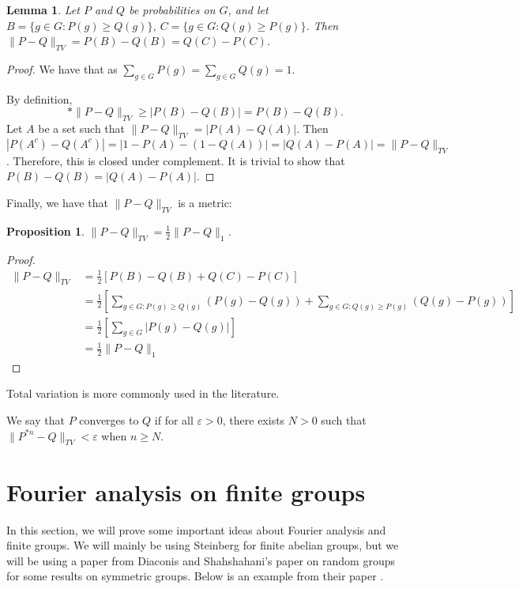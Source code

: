 \documentclass[]{article}
\newtheorem{proposition}[theorem]{Proposition}
\newtheorem{lemma}[theorem]{Lemma}
\theoremstyle{definition}
\numberwithin{theorem}{section}
\numberwithin{equation}{section}
\begin{document}
\begin{lemma}
	Let $P$ and $Q$ be probabilities on $G$, and let $B = \lbrace g \in G : P(g) \geq Q(g) \rbrace$, $C = \lbrace g \in G : Q(g) \geq P(g) \rbrace$.
	Then $\|P - Q \|_{TV} = P(B) - Q(B) = Q(C) - P(C)$.
\end{lemma}
\begin{proof}
	We have that as $\sum_{g \in G} P(g) = \sum_{g \in G} Q(g) = 1$. 
	
	
	By definition, 
	\begin{equation}*
		\|P - Q\|_{TV} \geq |P(B) - Q(B)| = P(B) - Q(B).
	\end{equation}
	Let $A$ be a set such that $\|P - Q\|_{TV} = |P(A) - Q(A)|.$ Then $|P(A^c) - Q(A^c)| = |1 - P(A) - (1 - Q(A))| = |Q(A) - P(A)| = \|P - Q \|_{TV}$. Therefore, this is closed under complement. It is trivial to show that $P(B) - Q(B) = |Q(A) - P(A)|$. 
\end{proof}
Finally, we have that $\|P - Q \|_{TV}$ is a metric:
\begin{proposition}
	\label{prop:distribution difference equality}
	$\|P - Q\|_{TV} = \frac{1}{2} \|P - Q \|_1$. 
\end{proposition}
\begin{proof}
	\begin{align*}
		\|P - Q\|_{TV} &= \frac{1}{2}[P(B) - Q(B) + Q(C) - P(C)]\\
		&=\frac{1}{2}\left[ \sum_{g \in G : P(g) \geq Q(g)} (P(g) - Q(g)) + \sum_{g \in G : Q(g) \geq P(g)} (Q(g) - P(g)) \right]\\
		&= \frac{1}{2}\left[ \sum_{g \in G}|P(g) - Q(g)| \right]\\
		&= \frac{1}{2}\|P - Q\|_1
	\end{align*}
\end{proof}
Total variation is more commonly used in the literature.

We say that $P$ converges to $Q$ if for all $\varepsilon > 0$, there exists $N > 0$ such that $\|P^{*n}- Q \|_{TV} < \varepsilon$ when $n \geq N$. 

\section{Fourier analysis on finite groups}\label{sec:Fourier Analysis}
In this section, we will prove some important ideas about Fourier analysis and finite groups. We will mainly be using Steinberg \cite{steinbergProbabilityRandomWalks2012} for finite abelian groups, but we will be using a paper from Diaconis and Shahshahani's paper on random groups \cite{diaconisGeneratingRandomPermutation1981} for some results on symmetric groups. Below is an example from their paper \cite{diaconisGeneratingRandomPermutation1981}.
\end{document}
